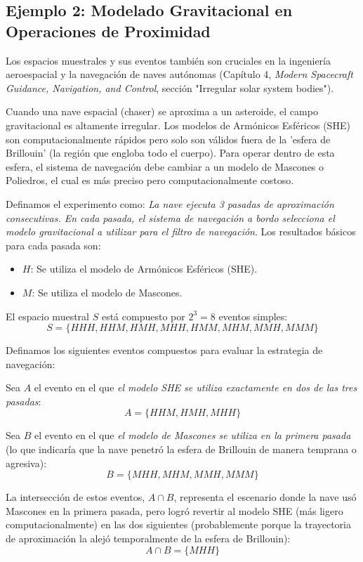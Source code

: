 \subsection{Ejemplo 2: Modelado Gravitacional en Operaciones de Proximidad}

Los espacios muestrales y sus eventos también son cruciales en la ingeniería aeroespacial y la navegación de naves autónomas (Capítulo 4, \textit{Modern Spacecraft Guidance, Navigation, and Control}, sección "Irregular solar system bodies"). 

Cuando una nave espacial (chaser) se aproxima a un asteroide, el campo gravitacional es altamente irregular. Los modelos de Armónicos Esféricos (SHE) son computacionalmente rápidos pero solo son válidos fuera de la 'esfera de Brillouin' (la región que engloba todo el cuerpo). Para operar dentro de esta esfera, el sistema de navegación debe cambiar a un modelo de Mascones o Poliedros, el cual es más preciso pero computacionalmente costoso.

Definamos el experimento como: \textit{La nave ejecuta 3 pasadas de aproximación consecutivas. En cada pasada, el sistema de navegación a bordo selecciona el modelo gravitacional a utilizar para el filtro de navegación}. 
Los resultados básicos para cada pasada son:
\begin{itemize}
    \item $H$: Se utiliza el modelo de Armónicos Esféricos (SHE).
    \item $M$: Se utiliza el modelo de Mascones.
\end{itemize}

El espacio muestral $S$ está compuesto por $2^3 = 8$ eventos simples:
$$ S = \{HHH, HHM, HMH, MHH, HMM, MHM, MMH, MMM\} $$

Definamos los siguientes eventos compuestos para evaluar la estrategia de navegación:

Sea $A$ el evento en el que \textit{el modelo SHE se utiliza exactamente en dos de las tres pasadas}:
$$ A = \{HHM, HMH, MHH\} $$

Sea $B$ el evento en el que \textit{el modelo de Mascones se utiliza en la primera pasada} (lo que indicaría que la nave penetró la esfera de Brillouin de manera temprana o agresiva):
$$ B = \{MHH, MHM, MMH, MMM\} $$

La intersección de estos eventos, $A \cap B$, representa el escenario donde la nave usó Mascones en la primera pasada, pero logró revertir al modelo SHE (más ligero computacionalmente) en las dos siguientes (probablemente porque la trayectoria de aproximación la alejó temporalmente de la esfera de Brillouin):
$$ A \cap B = \{MHH\} $$

